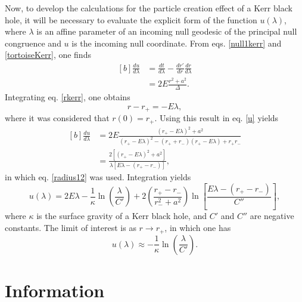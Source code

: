 \documentclass[
12pt,		%
openright,	%
twoside,  %
a4paper,			%
chapter=TITLE,		%
english,			%
french,				%
spanish,			%
brazil				%
]{USPSC-classe/USPSC}
\begin{document}
\begin{apendicesenv}
Now, to develop the calculations for the particle creation effect of a Kerr black hole, it will be necessary to evaluate the explicit form of the function $u(\lambda)$, where $\lambda$ is an affine parameter of an incoming null geodesic of the principal null congruence and $u$ is the incoming null coordinate. From eqs. \ref{null1kerr} and \ref{tortoiseKerr}, one finds
\begin{equation}\label{u}
    \begin{aligned}[b]
    \frac{du}{d\lambda}  & = \frac{dt}{d\lambda}-\frac{dr'}{dr}\frac{dr}{d\lambda}\\
    & = 2E\frac{r^2+a^2}{\Delta}.
    \end{aligned}
\end{equation}
Integrating eq. \ref{rkerr}, one obtains
\begin{equation}
    r-r_+=-E\lambda,
\end{equation}
where it was considered that $r(0)=r_+$. Using this result in eq. \ref{u} yields
\begin{equation}
    \begin{aligned}[b]
    \frac{du}{d\lambda}  & = 2E\frac{(r_+-E\lambda)^2+a^2}{(r_+-E\lambda)^2-(r_++r_-)(r_+-E\lambda)+r_+r_-}\\
    & = \frac{2[(r_+-E\lambda)^2+a^2]}{\lambda[E\lambda-(r_+-r_-)]},
    \end{aligned}
\end{equation}
in which eq. \ref{radius12} was used. Integration yields
\begin{equation}\label{dev}
    u(\lambda)=2E\lambda-\frac{1}{\kappa}\ln\left(\frac{\lambda}{C'}\right)+2\left(\frac{r_+-r_-}{r_-^2+a^2}\right)\ln\left[\frac{E\lambda-(r_+-r_-)}{C''}\right],
\end{equation}
where $\kappa$ is the surface gravity of a Kerr black hole, and $C'$ and $C''$ are negative constants. The limit of interest is as $r\to r_+$, in which one has
\begin{equation}\label{incoming}
    u(\lambda)\approx-\frac{1}{\kappa}\ln\left(\frac{\lambda}{C'}\right).
\end{equation}

\chapter{Information}\label{information} 


\end{apendicesenv}
\end{document}
